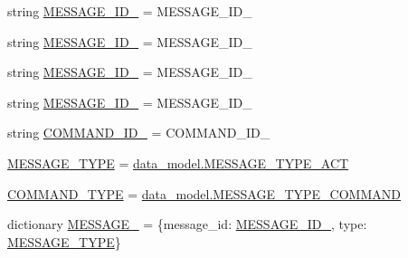 \begin{DoxyCompactItemize}
\item 
string \hyperlink{namespaceparlai_1_1mturk_1_1core_1_1dev_1_1test_1_1test__socket__manager_ac830482753fd002afae9e975d6fc17d0}{M\+E\+S\+S\+A\+G\+E\+\_\+\+I\+D\+\_} = \textquotesingle{}M\+E\+S\+S\+A\+G\+E\+\_\+\+I\+D\+\_\textquotesingle{}
\item 
string \hyperlink{namespaceparlai_1_1mturk_1_1core_1_1dev_1_1test_1_1test__socket__manager_a4047856e009ae0dafa34b8ade954eb7c}{M\+E\+S\+S\+A\+G\+E\+\_\+\+I\+D\+\_} = \textquotesingle{}M\+E\+S\+S\+A\+G\+E\+\_\+\+I\+D\+\_\textquotesingle{}
\item 
string \hyperlink{namespaceparlai_1_1mturk_1_1core_1_1dev_1_1test_1_1test__socket__manager_a85a5112d406fec82578b1eafc5541b4a}{M\+E\+S\+S\+A\+G\+E\+\_\+\+I\+D\+\_} = \textquotesingle{}M\+E\+S\+S\+A\+G\+E\+\_\+\+I\+D\+\_\textquotesingle{}
\item 
string \hyperlink{namespaceparlai_1_1mturk_1_1core_1_1dev_1_1test_1_1test__socket__manager_a1f7419c6adc4af8d29e85638a4101476}{M\+E\+S\+S\+A\+G\+E\+\_\+\+I\+D\+\_} = \textquotesingle{}M\+E\+S\+S\+A\+G\+E\+\_\+\+I\+D\+\_\textquotesingle{}
\item 
string \hyperlink{namespaceparlai_1_1mturk_1_1core_1_1dev_1_1test_1_1test__socket__manager_a636a3f531ee83785c992c9a433d9b17f}{C\+O\+M\+M\+A\+N\+D\+\_\+\+I\+D\+\_} = \textquotesingle{}C\+O\+M\+M\+A\+N\+D\+\_\+\+I\+D\+\_\textquotesingle{}
\item 
\hyperlink{namespaceparlai_1_1mturk_1_1core_1_1dev_1_1test_1_1test__socket__manager_af8cab4fa9e4add6b6a3c8fd105c9df17}{M\+E\+S\+S\+A\+G\+E\+\_\+\+T\+Y\+PE} = \hyperlink{namespaceparlai_1_1mturk_1_1core_1_1dev_1_1data__model_a54f29cc8a3c119ca6c74b83bc857376b}{data\+\_\+model.\+M\+E\+S\+S\+A\+G\+E\+\_\+\+T\+Y\+P\+E\+\_\+\+A\+CT}
\item 
\hyperlink{namespaceparlai_1_1mturk_1_1core_1_1dev_1_1test_1_1test__socket__manager_afaf4e06d721fc27fdf11dcedddf6fcac}{C\+O\+M\+M\+A\+N\+D\+\_\+\+T\+Y\+PE} = \hyperlink{namespaceparlai_1_1mturk_1_1core_1_1dev_1_1data__model_a04fb911d8dd6ce670b9dcadb28559eef}{data\+\_\+model.\+M\+E\+S\+S\+A\+G\+E\+\_\+\+T\+Y\+P\+E\+\_\+\+C\+O\+M\+M\+A\+ND}
\item 
dictionary \hyperlink{namespaceparlai_1_1mturk_1_1core_1_1dev_1_1test_1_1test__socket__manager_a51dbbbea9e79b3a35b32a8a3bafd8e66}{M\+E\+S\+S\+A\+G\+E\+\_} = \{\textquotesingle{}message\+\_\+id\textquotesingle{}\+: \hyperlink{namespaceparlai_1_1mturk_1_1core_1_1dev_1_1test_1_1test__socket__manager_ac830482753fd002afae9e975d6fc17d0}{M\+E\+S\+S\+A\+G\+E\+\_\+\+I\+D\+\_}, \textquotesingle{}type\textquotesingle{}\+: \hyperlink{namespaceparlai_1_1mturk_1_1core_1_1dev_1_1test_1_1test__socket__manager_af8cab4fa9e4add6b6a3c8fd105c9df17}{M\+E\+S\+S\+A\+G\+E\+\_\+\+T\+Y\+PE}\}

\end{DoxyCompactItemize}
